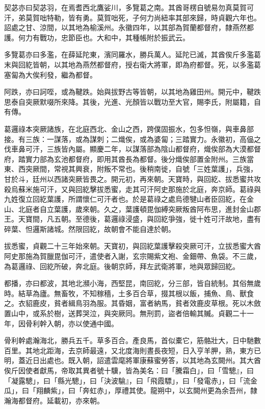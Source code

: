 \begin{pinyinscope}
 契苾亦曰契苾羽，在焉耆西北鷹娑川，多覽葛之南。其酋哥楞自號易勿真莫賀可汗，弟莫賀咄特勒，皆有勇。莫賀咄死，子何力尚紐率其部來歸，時貞觀六年也。詔處之甘、涼間，以其地為榆溪州。永徽四年，以其部為賀蘭都督府，隸燕然都護。何力有戰功，忠節臣也。大和中，其種帳附於振武云。



 多覽葛亦曰多濫，在薛延陀東，濱同羅水，勝兵萬人。延陀已滅，其酋俟斤多濫葛末與回紇皆朝，以其地為燕然都督府，授右衛大將軍，即為府都督。死，以多濫葛塞匐為大俟利發，繼為都督。



 阿跌，亦曰訶咥，或為鞬跌。始與拔野古等皆朝，以其地為雞田州。開元中，鞬跌思泰自突厥默啜所來降。其後，光進、光顏皆以戰功至大官，賜李氏，附屬籍，自有傳。



 葛邏祿本突厥諸族，在北庭西北、金山之西，跨僕固振水，包多怛嶺，與車鼻部接。有三族：一謀落，或為謀刺；二熾俟，或為婆匐；三踏實力。永徽初，高偘之伐車鼻可汗，三族皆內屬。顯慶二年，以謀落部為陰山都督府，熾俟部為大漠都督府，踏實力部為玄池都督府，即用其酋長為都督。後分熾俟部置金附州。三族當東、西突厥間，常視其興衰，附叛不常也。後稍南徙，自號「三姓葉護」，兵強，甘於斗，廷州以西諸突厥皆畏之。開元初，再來朝。天寶時，與回紇、拔悉蜜共攻殺烏蘇米施可汗，又與回紇擊拔悉蜜，走其可汗阿史那施於北庭，奔京師。葛祿與九姓復立回紇葉護，所謂懷仁可汗者也。於是葛祿之處烏德犍山者臣回紇，在金山、北庭者自立葉護，歲來朝。久之，葉護頓毘伽縛突厥叛酋阿布思，進封金山郡王。天寶間，凡五朝。至德後，葛邏祿浸盛，與回紇爭強，徙十姓可汗故地，盡有碎葉、怛邏斯諸城。然限回紇，故朝會不能自達於朝。



 拔悉蜜，貞觀二十三年始來朝。天寶初，與回紇葉護擊殺突厥可汗，立拔悉蜜大酋阿史那施為賀臘毘伽可汗，遣使者入謝，玄宗賜紫文袍、金鈿帶、魚袋。不三歲，為葛邏祿、回紇所破，奔北庭。後朝京師，拜左武衛將軍，地與眾歸回紇。



 都播，亦曰都波，其地北瀕小海，西堅昆，南回紇，分三部，皆自統制。其俗無歲時。結草為廬。無畜牧，不知稼穡，土多百合草，掇其根以飯，捕魚、鳥、獸食之。衣貂鹿皮，貧者緝鳥羽為服。其昏姻，富者納馬，貧者效鹿皮草根。死以木斂置山中，或系於樹，送葬哭泣，與突厥同。無刑罰，盜者倍輸其贓。貞觀二十一年，因骨利幹入朝，亦以使通中國。



 骨利幹處瀚海北，勝兵五千。草多百合。產良馬，首似橐它，筋骼壯大，日中馳數百里。其地北距海，去京師最遠，又北度海則晝長夜短，日入亨羊胛，熟，東方已明，蓋近日出處也。既入朝，詔遣雲麾將軍康蘇蜜勞答，以其地為玄闕州。其大酋俟斤因使者獻馬，帝取其異者號十驥，皆為美名：曰「騰霜白」，曰「雪驄』，曰「凝露驄」，曰「縣光驄」，曰「決波騟』，曰「飛霞驃」，曰「發電赤」，曰「流金瓜」，曰「翔麟紫」，曰「奔虹赤」，厚禮其使。龍朔中，以玄闕州更為余吾州，隸瀚海都督府。延載初，亦來朝。




\end{pinyinscope}
